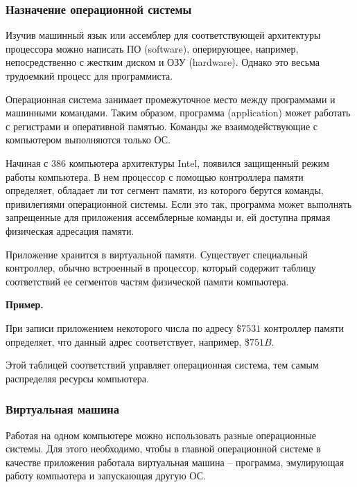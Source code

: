 \documentclass[a4paper, fleqn]{article}
\newenvironment{example}[1][]{\medskip \noindent \textbf{Пример. #1}\par \nopagebreak}{\medskip \par} %
\begin{document}
			
			\subsubsection*{Назначение операционной системы}
			 
			Изучив машинный язык или ассемблер для соответствующей архитектуры процессора можно написать ПО (software), оперирующее, например, непосредственно с жестким диском и ОЗУ (hardware). Однако это весьма трудоемкий процесс для программиста. 
			
			Операционная система занимает промежуточное место между программами и машинными командами. Таким образом, программа (application) может работать с регистрами и оперативной памятью. Команды же взаимодействующие с компьютером выполняются только ОС.
			
			Начиная с 386 компьютера архитектуры Intel, появился защищенный режим работы компьютера. В нем процессор с помощью контроллера памяти определяет, обладает ли тот сегмент памяти, из которого берутся команды, привилегиями операционной системы. Если это так, программа может выполнять запрещенные для приложения ассемблерные команды и, ей доступна прямая физическая адресация памяти. 
			
			Приложение хранится в виртуальной памяти. Существует специальный контроллер,
			обычно встроенный в процессор, который содержит таблицу соответствий ее сегментов частям физической памяти компьютера.
			
			\begin{example}
				
				При записи приложением некоторого числа по адресу \$$7531$ контроллер памяти определяет, что данный адрес соответствует, например, \$$751B$. 
			\end{example}
			
			Этой таблицей соответствий управляет операционная система, тем самым распределяя ресурсы компьютера.
			
			\subsubsection*{Виртуальная машина} 
		
			Работая на одном компьютере можно использовать разные операционные системы. Для этого необходимо, чтобы в главной операционной системе в качестве приложения работала виртуальная машина  – программа, эмулирующая работу компьютера и запускающая другую ОС. 
			
\end{document}
